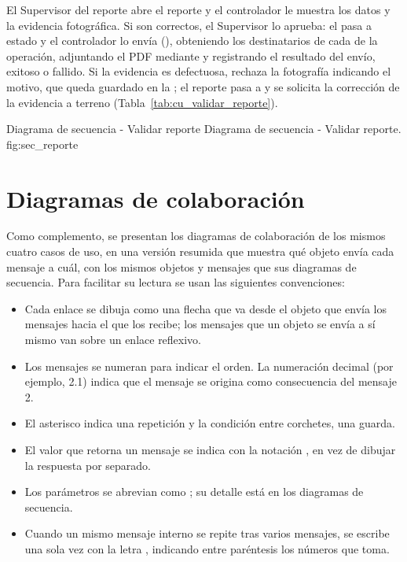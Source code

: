 El Supervisor del reporte abre el reporte y el controlador  le muestra los
datos y la evidencia fotográfica. Si son correctos, el Supervisor lo aprueba: el 
pasa a estado  y el controlador lo envía (), obteniendo los
destinatarios de cada  de la operación, adjuntando el PDF mediante
 y registrando el resultado del envío, exitoso o fallido. Si la evidencia es
defectuosa, rechaza la fotografía indicando el motivo, que queda guardado en la ;
el reporte pasa a  y se solicita la corrección de la evidencia a terreno
(Tabla~\ref{tab:cu_validar_reporte}).

{Diagrama de secuencia - Validar reporte}
{Diagrama de secuencia - Validar reporte.}
{fig:sec_reporte}

\section{Diagramas de colaboración}
\label{sec:colaboracion}

Como complemento, se presentan los diagramas de colaboración de los mismos cuatro casos de uso,
en una versión resumida que muestra qué objeto envía cada mensaje a cuál, con los mismos objetos y
mensajes que sus diagramas de secuencia. Para facilitar su lectura se usan las siguientes
convenciones:

\begin{itemize}
    \item Cada enlace se dibuja como una flecha que va desde el objeto que envía los mensajes hacia
          el que los recibe; los mensajes que un objeto se envía a sí mismo van sobre un enlace
          reflexivo.
    \item Los mensajes se numeran para indicar el orden. La numeración decimal (por ejemplo, 2.1)
          indica que el mensaje se origina como consecuencia del mensaje 2.
    \item El asterisco indica una repetición y la condición entre corchetes, una guarda.
    \item El valor que retorna un mensaje se indica con la notación ,
          en vez de dibujar la respuesta por separado.
    \item Los parámetros se abrevian como ; su detalle está en los diagramas de
          secuencia.
    \item Cuando un mismo mensaje interno se repite tras varios mensajes, se escribe una sola vez
          con la letra , indicando entre paréntesis los números que toma.
\end{itemize}

